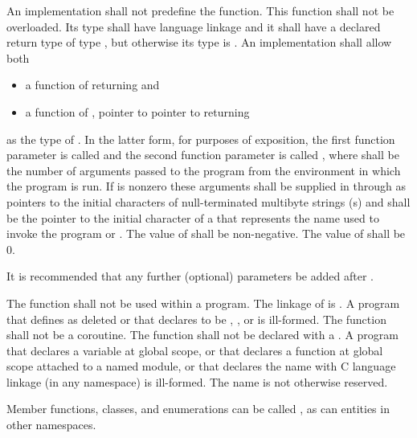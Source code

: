 \pnum
An implementation shall not predefine the  function. This
function shall not be overloaded.  Its type shall have \Cpp{} language linkage
and it shall have a declared return type of type
, but otherwise its type is .
%
An implementation shall allow both
\begin{itemize}
\item a function of \tcode{()} returning  and
\item a function of , pointer to pointer to  returning 
\end{itemize}
%
%
as the type of .
%
%
In the latter form, for purposes of exposition, the first function
parameter is called  and the second function parameter is
called , where  shall be the number of
arguments passed to the program from the environment in which the
program is run. If
 is nonzero these arguments shall be supplied in
 through  as pointers to the initial
characters of null-terminated multibyte strings (\ntmbs{}s)
and  shall be the pointer to
the initial character of a \ntmbs{} that represents the name used to
invoke the program or . The value of  shall be
non-negative. The value of  shall be 0.
\begin{note}
It
is recommended that any further (optional) parameters be added after
.
\end{note}

\pnum
The function  shall not be used within
a program.
%
The linkage of  is
. A program that defines  as
deleted or that declares  to be
, , or  is ill-formed.
The function  shall not be a coroutine.
The  function shall not be declared with a
.
A program that declares a variable  at global scope,
or that declares a function  at global scope attached to a named module,
or that declares the name  with C language linkage (in any namespace)
is ill-formed.
The name  is
not otherwise reserved.
\begin{example}
Member functions, classes, and
enumerations can be called , as can entities in other
namespaces.
\end{example}

